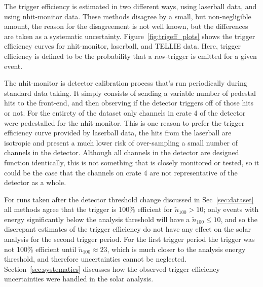 The trigger efficiency is estimated in two different ways, using laserball
data, and using nhit-monitor data.
These methods disagree by a small, but non-negligible amount, the
reason for the disagreement is not well known, but the differences are taken
as a systematic uncertainty.
Figure~\ref{fig:trigeff_plots} shows the trigger efficiency curves
for nhit-monitor, laserball, and TELLIE data.
Here, trigger efficiency is defined to be the probability that a raw-trigger
is emitted for a given event.

The nhit-monitor is detector calibration  process that's run periodically during
standard data taking. It simply consists of sending a variable number
of pedestal hits to the front-end, and then observing if the detector triggers
off of those hits or not. For the entirety of the dataset only channels in
crate 4 of the detector were pedestalled for the nhit-monitor.
This is one reason to prefer the trigger efficiency curve provided by laserball
data, the hits from the laserball are isotropic and present a much lower risk of
over-sampling a small number of channels in the detector. Although all channels
in the detector are designed function identically, this is not something that
is closely monitored or tested, so it could be the case that the channels on
crate 4 are not representative of the detector as a whole.

For runs taken after the detector threshold change discussed in Sec~\ref{sec:dataset}
all methods agree that the trigger is 100\% efficient for $\tilde{n}_{100} > 10$;
only events with energy significantly below the analysis threshold 
will have a $\tilde{n}_{100} \le 10$, and so the discrepant
estimates of the trigger
efficiency do not have any effect on the solar analysis for the second trigger period.
For the first trigger period the trigger was not 100\% efficient until
$\tilde{n}_{100} \approx 23$, which is much closer to the analysis energy
threshold, and therefore uncertainties cannot be neglected.
Section~\ref{sec:systematics} discusses how the observed trigger efficiency 
uncertainties were handled in the solar analysis.
